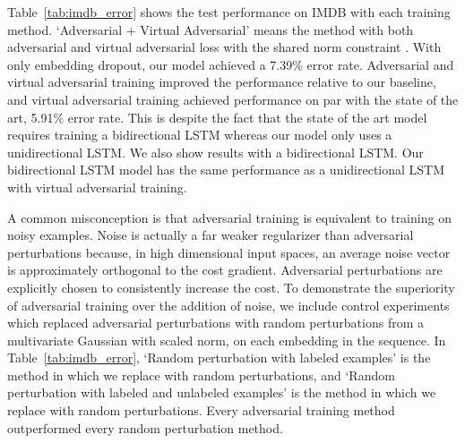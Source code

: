\documentclass{article}
\begin{document}
Table~\ref{tab:imdb_error} shows the test performance on IMDB with each training
method.
`Adversarial + Virtual Adversarial' means the method with both adversarial and
virtual adversarial loss with the shared norm constraint .
With only embedding dropout, our model achieved a 7.39\% error rate.
Adversarial and virtual adversarial training improved the performance
relative to our baseline, and virtual adversarial training achieved performance on par with
the state of
the art, 5.91\% error rate. This is despite the fact that the state of the art
model requires training a bidirectional LSTM whereas our model only uses a unidirectional LSTM.
We also show results with a bidirectional LSTM. Our bidirectional LSTM model
has the same performance as a unidirectional LSTM with virtual adversarial training.
 
A common misconception is that adversarial training is equivalent to training on
noisy examples.
Noise is actually a far weaker regularizer than adversarial perturbations because,
in high dimensional input spaces, an average noise vector is approximately orthogonal
to the cost gradient.
Adversarial perturbations are explicitly chosen to consistently increase the cost.
To demonstrate the superiority of adversarial training over the addition of noise,
we include control experiments 
which replaced adversarial perturbations with
random perturbations from a multivariate Gaussian with scaled norm, on each embedding in the sequence.
In Table~\ref{tab:imdb_error}, `Random perturbation with labeled examples' 
is the method in which we replace  with random perturbations,
and `Random perturbation with labeled and unlabeled examples' is the method
in which we replace  with random perturbations.
Every adversarial training method outperformed every random perturbation method.
\end{document}
